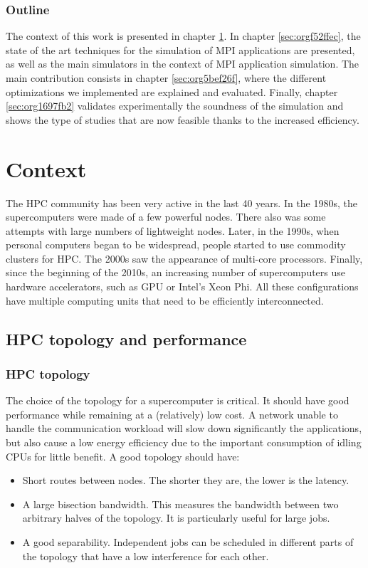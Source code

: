 \documentclass[12pt, a4paper]{memoir}
\begin{document}
\subsection{Outline}
\label{sec:org0dff904}
The context of this work is presented in chapter \ref{sec:org16f33bb}. In chapter \ref{sec:orgf52ffec}, the state of the art
techniques for the simulation of MPI applications are presented, as well as the main simulators in the context of
MPI application simulation. The main contribution consists in chapter \ref{sec:org5bef26f}, where the different
optimizations we implemented are explained and evaluated. Finally, chapter \ref{sec:org1697fb2} validates
experimentally the soundness of the simulation and shows the type of studies that are now feasible thanks to the
increased efficiency.
\chapter{Context}
\label{sec:org16f33bb}
The HPC community has been very active in the last 40 years. In the 1980s, the supercomputers were made of a few
powerful nodes. There also was some attempts with large numbers of lightweight nodes. Later, in the 1990s, when
personal computers began to be widespread, people started to use commodity clusters for HPC. The 2000s saw the
appearance of multi-core processors. Finally, since the beginning of the 2010s, an increasing number of supercomputers
use hardware accelerators, such as GPU or Intel's Xeon Phi. All these configurations have multiple computing units
that need to be efficiently interconnected.
\section{HPC topology and performance}
\label{sec:org320d296}
\subsection{HPC topology}
\label{sec:org45ac58b}
The choice of the topology for a supercomputer is critical. It should have good performance while remaining at a
(relatively) low cost. A network unable to handle the communication workload will slow down significantly the
applications, but also cause a low energy efficiency due to the important consumption of idling CPUs for little
benefit. A good topology should have:
\begin{itemize}
\item Short routes between nodes. The shorter they are, the lower is the latency.
\item A large bisection bandwidth. This measures the bandwidth between two arbitrary halves of the topology. It is
particularly useful for large jobs.
\item A good separability. Independent jobs can be scheduled in different parts of the topology that have a low
interference for each other.
\end{itemize}
\end{document}
